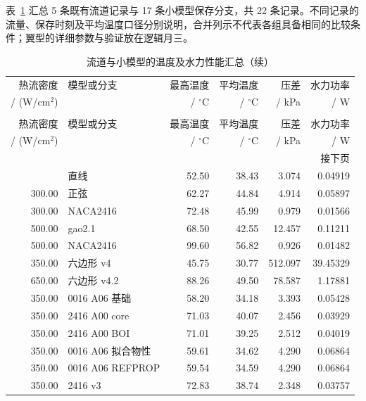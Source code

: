 \documentclass[stage2,fontset=fandol]{ydzjreport}
\begin{document}
表~\ref{tab:results} 汇总 5 条既有流道记录与 17 条小模型保存分支，共 22 条记录。不同记录的流量、保存时刻及平均温度口径分别说明，合并列示不代表各组具备相同的比较条件；翼型的详细参数与验证放在逻辑月三。

\begingroup
\small
\renewcommand{\arraystretch}{1.05}
\setlength{\tabcolsep}{4pt}
\setlength{\LTleft}{0pt}
\setlength{\LTright}{0pt plus 1fill}
\begin{longtable}{@{}r p{} r r r r@{}}
\caption{流道与小模型的温度及水力性能汇总（按数据来源与工况分组）}
\label{tab:results}\\
\toprule
\rowcolor{ydzjlight} 热流密度 & 模型或分支 & 最高温度 & 平均温度 & 压差 & 水力功率 \\
/ (W/cm$^2$) & & / $^\circ$C & / $^\circ$C & / kPa & / W \\
\midrule
\endfirsthead
\caption[]{流道与小模型的温度及水力性能汇总（续）}\\
\toprule
\rowcolor{ydzjlight} 热流密度 & 模型或分支 & 最高温度 & 平均温度 & 压差 & 水力功率 \\
/ (W/cm$^2$) & & / $^\circ$C & / $^\circ$C & / kPa & / W \\
\midrule
\endhead
\midrule
\multicolumn{6}{r}{\small 接下页}\\
\endfoot
\bottomrule
\endlastfoot
300.00 & 直线 & 52.50 & 38.43 & 3.074 & 0.04919 \\
300.00 & 正弦 & 62.27 & 44.84 & 4.914 & 0.05897 \\
300.00 & NACA2416 & 72.48 & 45.99 & 0.979 & 0.01566 \\
500.00 & gao2.1 & 68.50 & 42.55 & 12.457 & 0.11211 \\
500.00 & NACA2416 & 99.60 & 56.82 & 0.926 & 0.01482 \\
350.00 & 六边形 v4 & 45.75 & 30.77 & 512.097 & 39.45329 \\
650.00 & 六边形 v4.2 & 88.26 & 49.50 & 78.587 & 1.17881 \\
350.00 & 0016 A06 基础 & 58.20 & 34.18 & 3.393 & 0.05428 \\
350.00 & 2416 A00 core & 71.03 & 40.07 & 2.456 & 0.03929 \\
350.00 & 2416 A00 BOI & 71.01 & 39.25 & 2.512 & 0.04019 \\
350.00 & 0016 A06 拟合物性 & 59.61 & 34.62 & 4.290 & 0.06864 \\
350.00 & 0016 A06 REFPROP & 59.54 & 34.59 & 4.290 & 0.06864 \\
350.00 & 2416 v3 & 72.83 & 38.74 & 2.348 & 0.03757 \\

\end{longtable}
\end{document}
